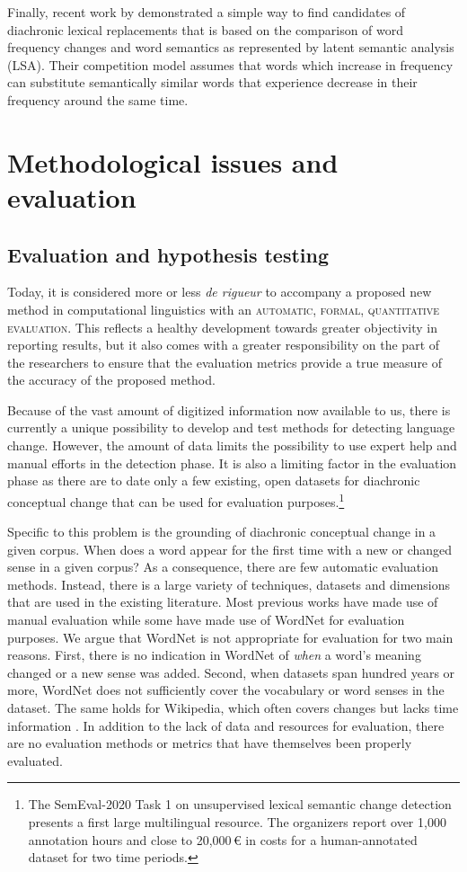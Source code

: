 \documentclass[output=paper]{langsci/langscibook}
\begin{document}
Finally, recent work by \citet{karjus2020communicative} demonstrated a simple way to find candidates of diachronic lexical replacements that is based on the comparison of word frequency changes and word semantics as represented by latent semantic analysis (LSA). Their competition model assumes that words which increase in frequency can substitute semantically similar words that experience decrease in their frequency around the same time. 


\section{Methodological issues and evaluation}\label{sec:method}
\subsection{Evaluation and hypothesis testing}\label{sec:evaltesting}
Today, it is considered more or less \emph{de rigueur} to accompany a proposed new method in computational linguistics with an \textsc{automatic, formal, quantitative evaluation}. This reflects a healthy development towards greater objectivity in reporting results, but it also comes with a greater responsibility on the part of the researchers to ensure that the evaluation metrics provide a true measure of the accuracy of the proposed method. 

Because of the vast amount of digitized information now available to us, there is currently a unique possibility to develop and test methods for detecting language change. However, the amount of data limits the possibility to use expert help and manual efforts in the detection phase. It is also a limiting factor in the evaluation phase as there are to date only a few existing, open datasets for diachronic conceptual change that can be used for evaluation purposes.\footnote{The SemEval-2020 Task 1 on unsupervised lexical semantic change detection presents a first large multilingual resource. The organizers report over 1,000 annotation hours and close to 20,000\,€ in costs for a human-annotated dataset for two time periods.} 

Specific to this problem is the grounding of diachronic conceptual change in a given corpus. When does a word appear for the first time with a new or changed sense in a given corpus? As a consequence, there are few automatic evaluation methods. Instead, there is a large variety of techniques, datasets and dimensions that are used in the existing literature. Most previous works have made use of manual evaluation while some have made use of WordNet for evaluation purposes. We argue that WordNet is not appropriate for evaluation for two main reasons. First, there is no indication in WordNet of \emph{when} a word's meaning changed or a new sense was added. Second, when datasets span hundred years or more, WordNet does not sufficiently cover the vocabulary or word senses in the dataset. The same holds for Wikipedia, which often covers changes but lacks time information \citep{holzmann2014insights}. In addition to the lack of data and resources for evaluation, there are no evaluation methods or metrics that have themselves been properly evaluated. 
\end{document}
